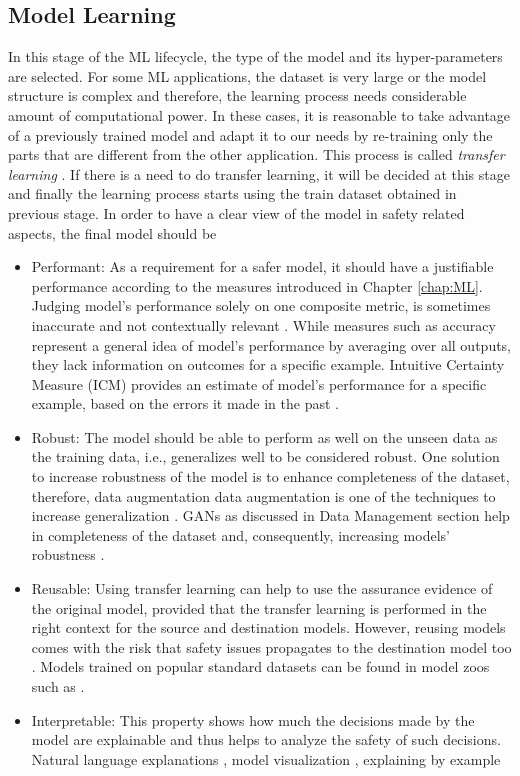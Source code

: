 \subsection{Model Learning}
In this stage of the ML lifecycle, the type of the model and its hyper-parameters are selected. For some ML applications, the dataset is very large or the model structure is complex and therefore, the learning process needs considerable amount of computational power. In these cases, it is reasonable to take advantage of a previously trained model and adapt it to our needs by re-training only the parts that are different from the other application. This process is called \textit{transfer learning} \cite{IanGoodfellow2016}. If there is a need to do transfer learning, it will be decided at this stage and finally the learning process starts using the train dataset obtained in previous stage.
In order to have a clear view of the model in safety related aspects, the final model should be \cite{Ashmore2021}  
\begin{itemize}
    \item Performant: As a requirement for a safer model, it should have a justifiable performance according to the measures introduced in Chapter \ref{chap:ML}. Judging model's performance solely on one composite metric, is sometimes inaccurate and not contextually relevant \cite{Flach2019}. While measures such as accuracy represent a general idea of model's performance by averaging over all outputs, they lack information on outcomes for a specific example. Intuitive Certainty Measure (ICM) provides an estimate of model's performance for a specific example, based on the errors it made in the past \cite{Wang2019}.
    \item Robust: The model should be able to perform as well on the unseen data as the training data, i.e., generalizes well to be considered robust. One solution to increase robustness of the model is to enhance completeness of the dataset, therefore, data augmentation data augmentation is one of the techniques to increase generalization \cite{Ko2015}. GANs as discussed in Data Management section help in completeness of the dataset and, consequently, increasing models' robustness \cite{Antonio2018}.
    \item Reusable: Using transfer learning can help to use the assurance evidence of the original model, provided that the transfer learning is performed in the right context for the source and destination models. However, reusing models comes with the risk that safety issues propagates to the destination model too \cite{Gu2019}. Models trained on popular standard datasets can be found in model zoos such as \cite{zoo21}\cite{zoo-caffe-21}.
    \item Interpretable: This property shows how much the decisions made by the model are explainable and thus helps to analyze the safety of such decisions. Natural language explanations \cite{Krenin2016}, model visualization \cite{Mahendran2015}, explaining by example \cite{Adhikari2018}
\end{itemize}

